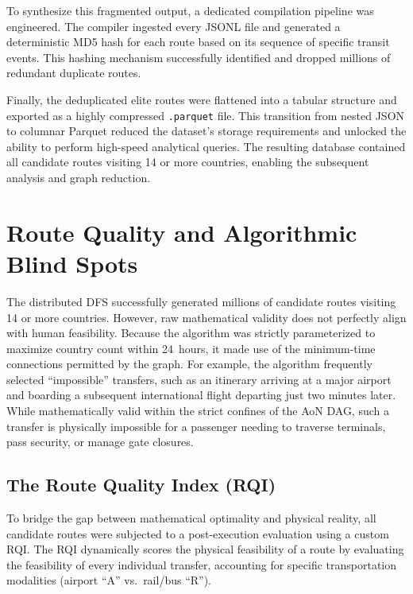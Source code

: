 \medskip

To synthesize this fragmented output, a dedicated compilation pipeline was engineered. The compiler ingested every JSONL file and generated a deterministic MD5 hash for each route based on its sequence of specific transit events. This hashing mechanism successfully identified and dropped millions of redundant duplicate routes.

\medskip

Finally, the deduplicated elite routes were flattened into a tabular structure and exported as a highly compressed \texttt{.parquet} file. This transition from nested JSON to columnar Parquet reduced the dataset's storage requirements and unlocked the ability to perform high-speed analytical queries. The resulting database contained all candidate routes visiting 14 or more countries, enabling the subsequent analysis and graph reduction.

\section{Route Quality and Algorithmic Blind Spots}
\label{sec:route_quality_blind_spots}

The distributed DFS successfully generated millions of candidate routes visiting 14 or more countries. However, raw mathematical validity does not perfectly align with human feasibility. Because the algorithm was strictly parameterized to maximize country count within 24~hours, it made use of the minimum-time connections permitted by the graph. For example, the algorithm frequently selected ``impossible'' transfers, such as an itinerary arriving at a major airport and boarding a subsequent international flight departing just two minutes later. While mathematically valid within the strict confines of the AoN DAG, such a transfer is physically impossible for a passenger needing to traverse terminals, pass security, or manage gate closures.
\medskip

\subsection{The Route Quality Index (RQI)}
\label{subsec:route_quality_index}

To bridge the gap between mathematical optimality and physical reality, all candidate routes were subjected to a post-execution evaluation using a custom RQI. The RQI dynamically scores the physical feasibility of a route by evaluating the feasibility of every individual transfer, accounting for specific transportation modalities (airport ``A'' vs.\ rail/bus ``R'').

